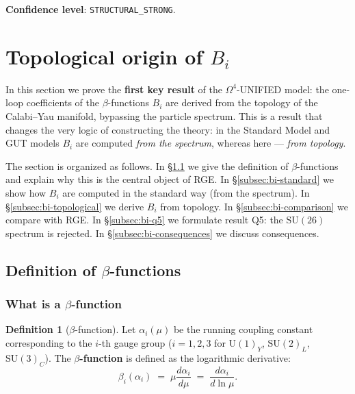 \documentclass[11pt,a4paper]{article}
\newcommand{\SU}{\ensuremath{\mathrm{SU}}}
\newcommand{\Om}{\ensuremath{\Omega^4}}
\theoremstyle{definition}
\newtheorem{definition}[theorem]{Definition}
\begin{document}
\medskip\noindent
\textbf{Confidence level}: \texttt{STRUCTURAL\_STRONG}.

\section{Topological origin of \texorpdfstring{$B_i$}{B\_i}}
\label{sec:bi}

In this section we prove the \textbf{first key result}
of the $\Om$-UNIFIED model: the one-loop coefficients of the
$\beta$-functions $B_i$ are derived from the topology of the
Calabi--Yau manifold, bypassing the particle spectrum. This is a
result that changes the very logic of constructing the theory:
in the Standard Model and GUT models $B_i$ are computed
\emph{from the spectrum}, whereas here --- \emph{from topology}.

The section is organized as follows.
In \S\ref{subsec:beta-functions-def} we give the definition of
$\beta$-functions and explain why this is the central object of RGE.
In \S\ref{subsec:bi-standard} we show how $B_i$ are computed
in the standard way (from the spectrum).
In \S\ref{subsec:bi-topological} we derive $B_i$ from topology.
In \S\ref{subsec:bi-comparison} we compare with RGE.
In \S\ref{subsec:bi-q5} we formulate result Q5:
the $\SU(26)$ spectrum is rejected.
In \S\ref{subsec:bi-consequences} we discuss consequences.

\subsection{Definition of \texorpdfstring{$\beta$-functions}{beta-функций}}
\label{subsec:beta-functions-def}

\subsubsection{What is a \texorpdfstring{$\beta$}{}-function}

\begin{definition}[$\beta$-function]
\label{def:beta-function}
Let $\alpha_i(\mu)$ be the running coupling constant corresponding to
the $i$-th gauge group ($i = 1, 2, 3$ for $\mathrm{U}(1)_Y$,
$\mathrm{SU}(2)_L$, $\mathrm{SU}(3)_C$). The \textbf{$\beta$-function}
is defined as the logarithmic derivative:
\begin{equation}
    \beta_i(\alpha_i) \;=\; \mu \frac{d \alpha_i}{d\mu}
    \;=\; \frac{d \alpha_i}{d \ln \mu}.
    \label{eq:beta-def}
\end{equation}
\end{definition}
\end{document}
